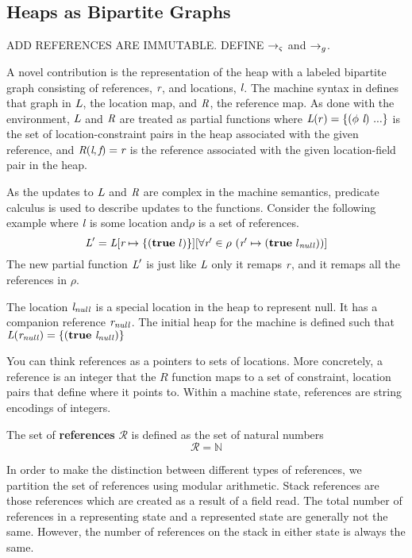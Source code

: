 \subsection{Heaps as Bipartite Graphs}
ADD REFERENCES ARE IMMUTABLE.
DEFINE $\rightarrow_{\varsigma}$ and $\rightarrow_{g}$.

A novel contribution is the representation of the heap with a labeled
bipartite graph consisting of references, $\emph{r}$, and locations,
$\emph{l}$. The machine syntax in  defines
that graph in $\emph{L}$, the location map, and $\emph{R}$, the
reference map. As done with the environment, $\emph{L}$ and
$\emph{R}$ are treated as partial functions where $\emph{L}(r) =
\{(\phi\ \emph{l})\ ...\}$ is the set of location-constraint pairs in
the heap associated with the given reference, and
$\emph{R}(\emph{l},\emph{f}) = \emph{r}$ is the reference
associated with the given location-field pair in the heap.

As the updates to $\emph{L}$ and $\emph{R}$ are complex in the
machine semantics, predicate calculus is used to describe updates to
the functions. Consider the following example where $\emph{l}$ is
some location and$\rho$ is a set of references.
\[
\cfgnt{L}^\prime = \cfgnt{L}[\cfgnt{r} \mapsto \{\lp \cfgt{true}\ l\rp \}][\forall \cfgnt{r}^\prime \in \rho\ \lp \cfgnt{r}^\prime \mapsto \lp \cfgt{true}\ l_\mathit{null}\rp \rp ]
\]
The new partial function $\emph{L}^\prime$ is just like $\emph{L}$
only it remaps $\emph{r}$, and it remaps all the references in
$\rho$.

The location $\emph{l}_\mathit{null}$ is a special location in the
heap to represent null. It has a companion reference
$\emph{r}_\mathit{null}$. The initial heap for the machine is defined
such that $\emph{L}(\emph{r}_\mathit{null}) =
\{(\textbf{true}\ \emph{l}_\mathit{null})\}$

You can think references as a pointers to sets of locations. More
concretely, a reference is an integer that the $R$ function maps to a
set of constraint, location pairs that define where it points
to. Within a machine state, references are string encodings of
integers.

\begin{definition}
The set of \textbf{references} $\mathcal{R}$ is defined as the set of natural numbers
 $$\mathcal{R} = \mathbb{N}$$
\end{definition}

In order to make the distinction between different types of references, we partition the set of references using modular arithmetic. Stack references are those references which are created as a result of a field read. The total number of references in a representing state and a represented state are generally not the same. However, the number of references on the stack in either state is always the same. 


